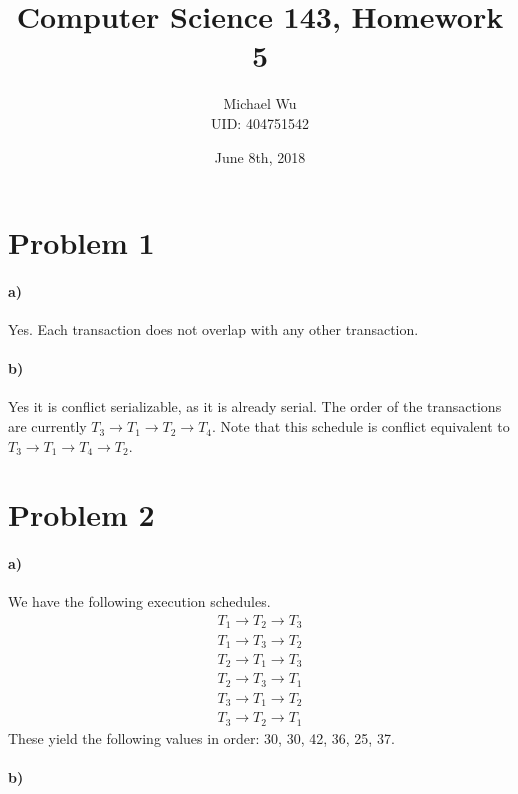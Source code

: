 \documentclass[12pt]{article}
\begin{document}
\title{Computer Science 143, Homework 5}
\date{June 8th, 2018}
\author{Michael Wu\\UID: 404751542}
\maketitle

\section*{Problem 1}

\paragraph{a)}

Yes. Each transaction does not overlap with any other transaction.

\paragraph{b)}

Yes it is conflict serializable, as it is already serial. The order of the transactions are currently \(T_3\rightarrow T_1\rightarrow T_2\rightarrow T_4\).
Note that this schedule is conflict equivalent to \(T_3\rightarrow T_1\rightarrow T_4\rightarrow T_2\).

\section*{Problem 2}

\paragraph{a)}

We have the following execution schedules.
\begin{gather*}
        T_1\rightarrow T_2\rightarrow T_3\\
        T_1\rightarrow T_3\rightarrow T_2\\
        T_2\rightarrow T_1\rightarrow T_3\\
        T_2\rightarrow T_3\rightarrow T_1\\
        T_3\rightarrow T_1\rightarrow T_2\\
        T_3\rightarrow T_2\rightarrow T_1
\end{gather*}
These yield the following values in order: 30, 30, 42, 36, 25, 37.

\paragraph{b)}
\end{document}
